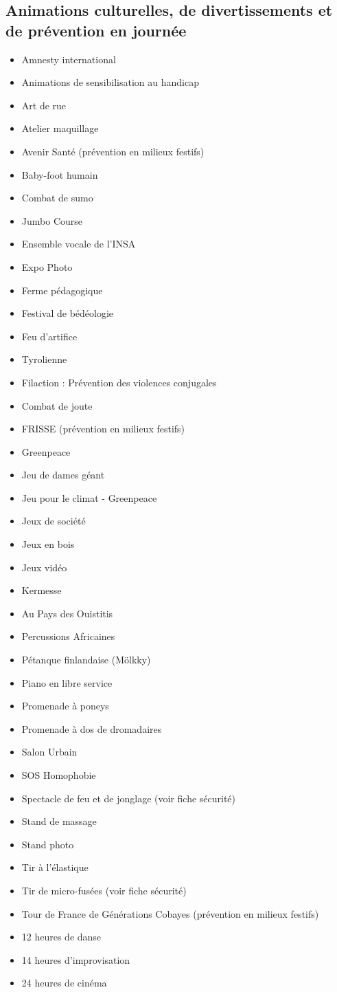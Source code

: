 \documentclass[hidelinks, paper=a4, fontsize=13pt]{report}
\begin{document}
\subsection{Animations culturelles, de divertissements et de prévention en journée}
\begin{itemize}
\item Amnesty international
\item Animations de sensibilisation au handicap
\item Art de rue
\item Atelier maquillage
\item Avenir Santé (prévention en milieux festifs)
\item Baby-foot humain
\item Combat de sumo
\item Jumbo Course 
\item Ensemble vocale de l'INSA
\item Expo Photo
\item Ferme pédagogique
\item Festival de bédéologie
\item Feu d’artifice 
\item Tyrolienne
\item Filaction : Prévention des violences conjugales
\item Combat de joute
\item FRISSE (prévention en milieux festifs)
\item Greenpeace
\item Jeu de dames géant
\item Jeu pour le climat - Greenpeace
\item Jeux de société
\item Jeux en bois
\item Jeux vidéo
\item Kermesse
\item Au Pays des Ouistitis
\item Percussions Africaines
\item Pétanque finlandaise (Mölkky)
\item Piano en libre service
\item Promenade à poneys
\item Promenade à dos de dromadaires
\item Salon Urbain
\item SOS Homophobie
\item Spectacle de feu et de jonglage (voir fiche sécurité)
\item Stand de massage
\item Stand photo
\item Tir à l'élastique
\item Tir de micro-fusées (voir fiche sécurité)
\item Tour de France de Générations Cobayes (prévention en milieux festifs)
\item 12 heures de danse
\item 14 heures d’improvisation
\item 24 heures de cinéma
\end{itemize}
\end{document}

